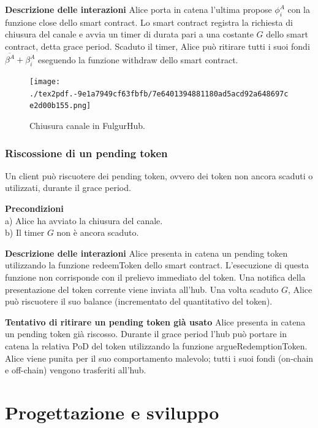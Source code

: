 \documentclass[12pt,italian,]{book}
\begin{document}
\textbf{\textbf{Descrizione delle interazioni}} Alice porta in catena l'ultima propose \(\phi^A_i\) con la funzione close dello smart contract. Lo smart contract registra la richiesta di chiusura del canale e avvia un timer di durata pari a una costante \(G\) dello smart contract, detta grace period. Scaduto il timer, Alice può ritirare tutti i suoi fondi \(\overline{\beta^A}+\beta^A_{i}\) eseguendo la funzione withdraw dello smart contract.

\begin{figure}
\centering
\texttt{[image: ./tex2pdf.-9e1a7949cf63fbfb/7e6401394881180ad5acd92a648697ce2d00b155.png]}
\caption{\protect\hypertarget{caso-duso-chiusura-canale}{}{}Chiusura canale in FulgurHub.}
\end{figure}

\hypertarget{riscossione-di-un-pending-token}{%
\subsection{Riscossione di un pending token}\label{riscossione-di-un-pending-token}}

Un client può riscuotere dei pending token, ovvero dei token non ancora scaduti o utilizzati, durante il grace period.

\textbf{\textbf{Precondizioni}}\\
a) Alice ha avviato la chiusura del canale.\\
b) Il timer \(G\) non è ancora scaduto.

\textbf{\textbf{Descrizione delle interazioni}} Alice presenta in catena un pending token utilizzando la funzione redeemToken dello smart contract. L'esecuzione di questa funzione non corrisponde con il prelievo immediato del token. Una notifica della presentazione del token corrente viene inviata all'hub. Una volta scaduto \(G\), Alice può riscuotere il suo balance (incrementato del quantitativo del token).

\textbf{\textbf{Tentativo di ritirare un pending token già usato}} Alice presenta in catena un pending token già riscosso. Durante il grace period l'hub può portare in catena la relativa PoD del token utilizzando la funzione argueRedemptionToken. Alice viene punita per il suo comportamento malevolo; tutti i suoi fondi (on-chain e off-chain) vengono trasferiti all'hub.

\hypertarget{progettazione-e-sviluppo}{%
\chapter{Progettazione e sviluppo}\label{progettazione-e-sviluppo}}
\end{document}
